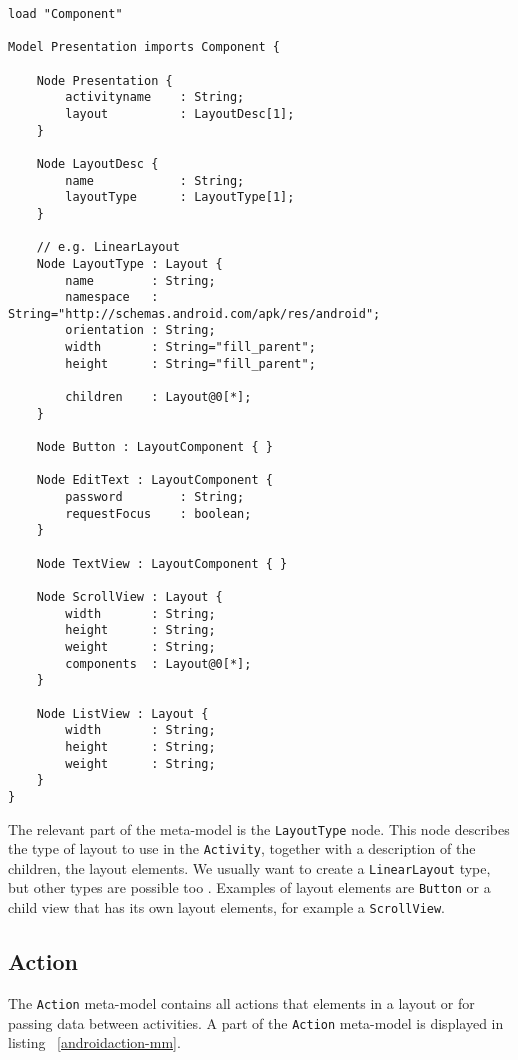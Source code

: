 \begin{lstlisting}[label=presentation-mm,caption=Presentation meta-model, captionpos=t]
load "Component"

Model Presentation imports Component {
	
	Node Presentation {
		activityname 	: String;
		layout 			: LayoutDesc[1];
	}

	Node LayoutDesc {
		name			: String;
		layoutType		: LayoutType[1];
	}

	// e.g. LinearLayout
	Node LayoutType : Layout {
		name 		: String;
		namespace	: String="http://schemas.android.com/apk/res/android";
		orientation	: String;
		width		: String="fill_parent";
		height		: String="fill_parent";

		children 	: Layout@0[*];
	}

	Node Button : LayoutComponent { }

	Node EditText : LayoutComponent {
		password 		: String;
		requestFocus	: boolean;
	}

	Node TextView : LayoutComponent { }

	Node ScrollView : Layout {
		width 		: String;
		height 		: String;
		weight 		: String;
		components 	: Layout@0[*];
	}

	Node ListView : Layout {
		width		: String;
		height		: String;
		weight		: String;
	}
}
\end{lstlisting}
The relevant part of the meta-model is the \texttt{LayoutType} node. This node describes the type of layout to use in the \texttt{Activity}, together with a description of the children, the layout elements. We usually want to create a \texttt{LinearLayout} type, but other types are possible too \cite{AndroidLayoutType}. Examples of layout elements are \texttt{Button} or a child view that has its own layout elements, for example a \texttt{ScrollView}.

\subsection{Action}

The \texttt{Action} meta-model contains all actions that elements in a layout or for passing data between activities. A part of the \texttt{Action} meta-model is displayed in listing ~\ref{androidaction-mm}.

